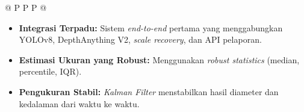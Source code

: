 \documentclass[12pt,a4paper]{article}
\newlength{\colwidth}
\begin{document}
\begin{longtable}{@{} P{\colwidth} P{\colwidth} P{\colwidth} @{}}
\begin{itemize}
    \item \textbf{Integrasi Terpadu:} Sistem \textit{end-to-end} pertama yang menggabungkan YOLOv8, DepthAnything V2, \textit{scale recovery}, dan API pelaporan.
    \item \textbf{Estimasi Ukuran yang Robust:} Menggunakan \textit{robust statistics} (median, percentile, IQR).
    \item \textbf{Pengukuran Stabil:} \textit{Kalman Filter} menstabilkan hasil diameter dan kedalaman dari waktu ke waktu.
\end{itemize}

\end{longtable}

\vspace{1cm}

\end{document}
